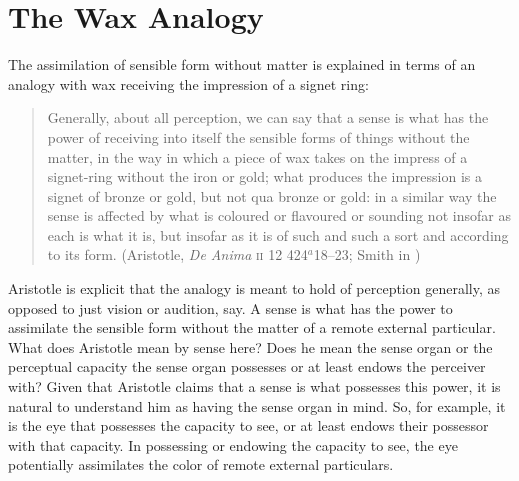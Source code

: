 
\section{The Wax Analogy} %
\label{sec:the_wax_analogy}

The assimilation of sensible form without matter is explained in terms of an analogy with wax receiving the impression of a signet ring:
\begin{quote}
	Generally, about all perception, we can say that a sense is what has the power of receiving into itself the sensible forms of things without the matter, in the way in which a piece of wax takes on the impress of a signet-ring without the iron or gold; what produces the impression is a signet of bronze or gold, but not qua bronze or gold: in a similar way the sense is affected by what is coloured or flavoured or sounding not insofar as each is what it is, but insofar as it is of such and such a sort and according to its form. (Aristotle, \emph{De Anima} \textsc{ii} 12 424\( ^{a} \)18--23; Smith in \citealt[42--43]{Barnes:1984uq})
\end{quote}
Aristotle is explicit that the analogy is meant to hold of perception generally, as opposed to just vision or audition, say. A sense is what has the power to assimilate the sensible form without the matter of a remote external particular. What does Aristotle mean by sense here? Does he mean the sense organ or the perceptual capacity the sense organ possesses or at least endows the perceiver with? Given that Aristotle claims that a sense is what possesses this power, it is natural to understand him as having the sense organ in mind. So, for example, it is the eye that possesses the capacity to see, or at least endows their possessor with that capacity. In possessing or endowing the capacity to see, the eye potentially assimilates the color of remote external particulars.

